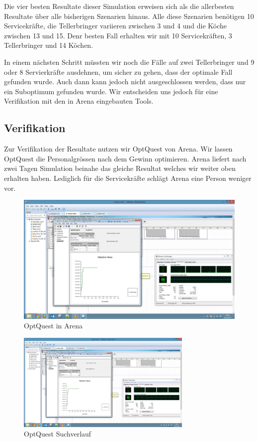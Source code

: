\documentclass[ngerman,a4paper,12pt]{scrreprt}
\begin{document}
			Die vier besten Resultate dieser Simulation erweisen sich als die allerbesten Resultate über alle bisherigen Szenarien hinaus. Alle diese Szenarien benötigen 10 Servicekräfte, die Tellerbringer variieren zwischen 3 und 4 und die Köche zwischen 13 und 15. Denr besten Fall erhalten wir mit 10 Servicekräften, 3 Tellerbringer und 14 Köchen.
			
			In einem nächsten Schritt müssten wir noch die Fälle auf zwei Tellerbringer und 9 oder 8 Servierkräfte ausdehnen, um sicher zu gehen, dass der optimale Fall gefunden wurde. Auch dann kann jedoch nicht ausgeschlossen werden, dass nur ein Suboptimum gefunden wurde. Wir entscheiden uns jedoch für eine Verifikation mit den in Arena eingebauten Tools.
		
		\subsection{Verifikation}
			Zur Verifikation der Resultate nutzen wir OptQuest von Arena. Wir lassen OptQuest die Personalgrössen nach dem Gewinn optimieren. Arena liefert nach zwei Tagen Simulation beinahe das gleiche Resultat welches wir weiter oben erhalten haben. Lediglich für die Servicekräfte schlägt Arena eine Person weniger vor.
			\begin{figure}[H]
				\centering
					\includegraphics[width=\textwidth]{img/OptQuest.PNG}
					\caption[OptQuest in Arena]{OptQuest in Arena}
					\label{optQuestInArena}
			\end{figure}
			
			\begin{figure}[H]
				\centering
					\includegraphics[trim=10cm 3.5cm 18.5cm 12.5cm, clip=true,width=0.75\textwidth]{img/OptQuest.PNG}
					\caption[OptQuest Suchverlauf]{OptQuest Suchverlauf}
					\label{optQuestSuchverlauf}
			\end{figure}
			
\end{document}
